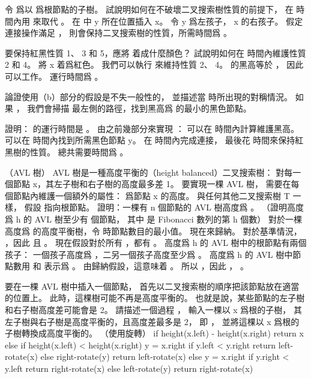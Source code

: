 \startitem%
令  爲以  爲根節點的子樹。
試說明如何在不破壞二叉搜索樹性質的前提下，
在  時間內用  來取代 。
\stopitem
\startANSWER
在  中 y 所在位置插入 x。
令 y 爲左孩子， x 的右孩子。
假定連接操作滿足 ，
則會保持二叉搜索樹的性質，所需時間爲 。
\stopANSWER

\startitem%
要保持紅黑性質 1、 3 和 5，應將  着成什麼顏色？
試說明如何在  時間內維護性質 2 和 4。
\stopitem
\startANSWER
將 x 着爲紅色。
我們可以執行  來維持性質 2、 4。
  的黑高等於 ，
因此  可以工作。
運行時間爲 。
\stopANSWER

\startitem%
論證使用（b）部分的假設是不失一般性的，
並描述當  時所出現的對稱情況。
\stopitem
\startANSWER
如果 ，
我們會掃描  最左側的路徑，找到黑高爲  的最小的黑色節點。
\stopANSWER

\startitem%
證明：  的運行時間是 。
\stopitem
\startANSWER
由之前幾部分來實現 ：
可以在  時間內計算維護黑高。
可以在  時間內找到所需黑色節點 y。
在  時間內完成連接，
最後花  時間來保持紅黑樹的性質。
總共需要時間爲 。
\stopANSWER

\stopigBase
\stopPROBLEM

\startPROBLEM
（AVL 樹）
 AVL 樹是一種{\EMP 高度平衡的（height balanced）}二叉搜索樹：
對每一個節點 x，其左子樹和右子樹的高度最多差 1。
要實現一棵 AVL 樹，
需要在每個節點內維護一個額外的屬性：  爲節點 x 的高度。
與任何其他二叉搜索樹 T 一樣，
假設  指向根節點。
\startigBase[a]
\startitem%
證明：一棵有 n 個節點的 AVL 樹高度爲 。
（\hint 證明高度爲 h 的 AVL 樹至少有  個節點，
其中  是 Fibonacci 數列的第 h 個數）
\stopitem
\startANSWER
對於一棵高度爲  的高度平衡樹，令  時節點數目的最小值。
現在來歸納。
對於基準情況， ，因此  且 。
現在假設對於所有 ，都有 。
高度爲 h 的 AVL 樹中的根節點有兩個孩子：
一個孩子高度爲 ，二另一個孩子高度至少爲 。
高度爲 h 的 AVL 樹中節點數用  和  表示爲 。
由歸納假設，這意味着 。
所以 ，因此 ， 。
\stopANSWER

\startitem%
要在一棵 AVL 樹中插入一個節點，
首先以二叉搜索樹的順序把該節點放在適當的位置上。
此時，這棵樹可能不再是高度平衡的。
也就是說，某些節點的左子樹和右子樹高度差可能會是 2。
請描述一個過程 ，
輸入一棵以 x 爲根的子樹，
其左子樹與右子樹是高度平衡的，且高度差最多是 2，
即 ，
並將這棵以 x 爲根的子樹轉換成高度平衡的。
（\hint 使用旋轉）
\stopitem
\startANSWER
{}
\startCLRS
if height(x.left) - height(x.right) 
	return x
else if height(x.left) < height(x.right)
	y = x.right
	if y.left < y.right
		return left-rotate(x)
	else
		right-rotate(y)
		return left-rotate(x)
else
	y = x.right
	if y.right < y.left
		return right-rotate(x)
	else
		left-rotate(y)
		return right-rotate(x)
\stopCLRS
\stopANSWER

